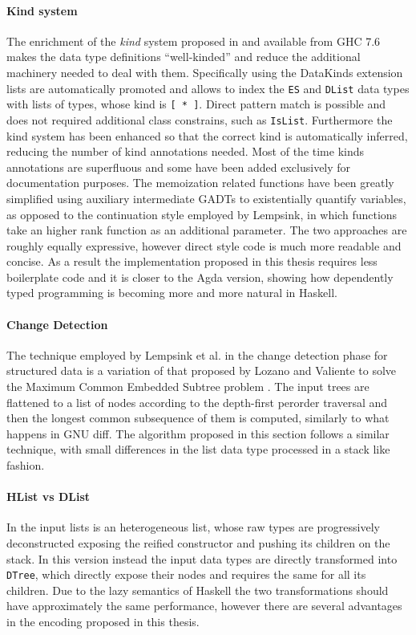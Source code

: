 \documentclass[../Thesis.tex]{subfiles}
\begin{document}
	\paragraph{Kind system}
	The enrichment of the \emph{kind} system proposed in
	\cite{Yorgey12} and available from GHC 7.6
	makes the data type definitions ``well-kinded''
	and reduce the additional machinery needed to deal with them.
	Specifically using the DataKinds extension lists are 
	automatically promoted and allows to index the \texttt{ES}
	and \texttt{DList} data types with lists of types, whose kind is 
	\texttt{[ * ]}.
	Direct pattern match is possible and does not required 
	additional class constrains, such as \texttt{IsList}.
	Furthermore the kind system has been enhanced so that
	the correct kind is automatically inferred, reducing the number
	of kind annotations needed. Most of the time kinds 
	annotations are superfluous and some have been
	added exclusively for documentation purposes.
	The memoization related functions have been greatly 
	simplified using auxiliary intermediate GADTs to
	existentially quantify variables, as opposed to the continuation
	style employed by  Lempsink, in which functions take
	an higher rank function as an additional parameter.
	The two approaches are roughly equally expressive, however
	direct style code is much more readable and concise.
	As a result the implementation proposed in this thesis 
	requires less boilerplate code and it is closer to the
	Agda version, showing how dependently typed programming
	is becoming more and more natural in Haskell.

	\paragraph{Change Detection}
	The technique employed by Lempsink et al. in the 
	change detection phase for structured data is a variation of
	that proposed by Lozano and Valiente to solve the
	Maximum Common Embedded Subtree problem \cite{Lozano}.
	The input trees are flattened to a list of nodes according to the 
	depth-first perorder traversal and then the longest common
	subsequence of them is computed, similarly to what happens
	in GNU diff. The algorithm proposed in this section follows
	a similar technique, with small differences in the list data type 
	processed in a stack like fashion.

	\paragraph{HList vs DList}	
	In \cite{Lemp09} the input lists is an heterogeneous list, whose 
	raw types are progressively deconstructed exposing the 
	reified constructor and pushing its	children on the stack. In this version 
	instead the input data 	types are directly transformed into 
	\texttt{DTree}, which directly expose their nodes and 
	requires the same for all its children. Due to the lazy semantics of Haskell 
	the two transformations should have approximately the same performance,		
	however there are several advantages in the encoding proposed in this
	thesis.
	
\end{document}

